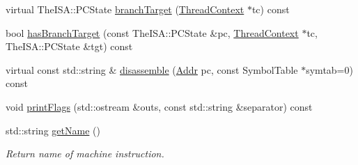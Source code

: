 \begin{DoxyCompactItemize}
\item 
virtual TheISA::PCState \hyperlink{classStaticInst_ad126194d9e34405bfc297b8b028f640d}{branchTarget} (\hyperlink{classThreadContext}{ThreadContext} $\ast$tc) const 
\item 
bool \hyperlink{classStaticInst_a2db4eab463c2d474648251de42a1b5e6}{hasBranchTarget} (const TheISA::PCState \&pc, \hyperlink{classThreadContext}{ThreadContext} $\ast$tc, TheISA::PCState \&tgt) const 
\item 
virtual const std::string \& \hyperlink{classStaticInst_acce45da56f8154aec68848514c4f819f}{disassemble} (\hyperlink{base_2types_8hh_af1bb03d6a4ee096394a6749f0a169232}{Addr} pc, const SymbolTable $\ast$symtab=0) const 
\item 
void \hyperlink{classStaticInst_a075612781e45266370c86be07b9086f2}{printFlags} (std::ostream \&outs, const std::string \&separator) const 
\item 
std::string \hyperlink{classStaticInst_ac0fc966d4386ddb71d99361e3fccb311}{getName} ()
\begin{DoxyCompactList}\small\item\em Return name of machine instruction. \item\end{DoxyCompactList}\end{DoxyCompactItemize}
